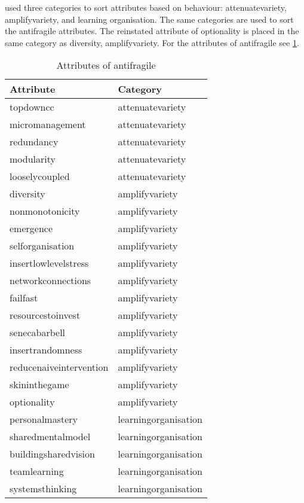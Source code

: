 \textcite[p.~4]{Botjes2021} used three categories to sort attributes based on behaviour: \gls{attenuatevariety}, \gls{amplifyvariety}, and learning organisation. The same categories are used to sort the \gls{antifragile} \glspl{attribute}. The reinstated \gls{attribute} of \gls{optionality} is placed in the same category as \gls{diversity}, \gls{amplifyvariety}. For the \glspl{attribute} of \gls{antifragile} see \cref{tab:attributesofantifragile}.
\begin{longtable}{@{}p{}p{}@{}}
	\toprule%
	\textbf{Attribute} & \textbf{Category} \\%
	\midrule%
	\endhead%
	\hline
	\endfoot%
	\caption[Attributes of antifragile]{Attributes of antifragile}
	\label{tab:attributesofantifragile}
	\endlastfoot%
	\Gls{topdowncc} & \Gls{attenuatevariety} \\%
	\Gls{micromanagement} & \Gls{attenuatevariety} \\%
	\Gls{redundancy} & \Gls{attenuatevariety} \\%
	\Gls{modularity} & \Gls{attenuatevariety} \\%
	\Gls{looselycoupled} & \Gls{attenuatevariety} \\%
	\Gls{diversity} & \Gls{amplifyvariety} \\%
	\Gls{nonmonotonicity} & \Gls{amplifyvariety} \\%
	\Gls{emergence} & \Gls{amplifyvariety} \\%
	\Gls{selforganisation} & \Gls{amplifyvariety} \\%
	\Gls{insertlowlevelstress} & \Gls{amplifyvariety} \\%
	\Gls{networkconnections}  & \Gls{amplifyvariety} \\%
	\Gls{failfast} & \Gls{amplifyvariety} \\%
	\Gls{resourcestoinvest} & \Gls{amplifyvariety} \\%
	\Gls{senecabarbell} & \Gls{amplifyvariety} \\%
	\Gls{insertrandomness} & \Gls{amplifyvariety} \\%
	\Gls{reducenaiveintervention} & \Gls{amplifyvariety} \\%
	\Gls{skininthegame} & \Gls{amplifyvariety} \\%
	\Gls{optionality} &  \Gls{amplifyvariety} \\%
	\Gls{personalmastery} &  \Gls{learningorganisation} \\%
	\Gls{sharedmentalmodel} &  \Gls{learningorganisation} \\%
	\Gls{buildingsharedvision} &  \Gls{learningorganisation} \\%
	\Gls{teamlearning} &  \Gls{learningorganisation} \\%
	\Gls{systemsthinking} &  \Gls{learningorganisation} \\%
	\bottomrule%
\end{longtable}
\newpage
